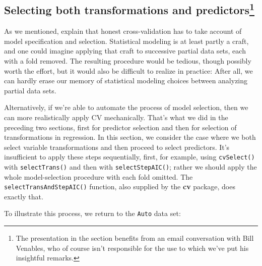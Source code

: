 \documentclass[
]{jss}
\begin{document}
\hypertarget{selecting-both-transformations-and-predictorsvenables}{%
\subsection[Selecting both transformations and
predictors]{\texorpdfstring{Selecting both transformations and
predictors\footnote{The presentation in the section benefits from an
  email conversation with Bill Venables, who of course isn't responsible
  for the use to which we've put his insightful remarks.}}{Selecting both transformations and predictors}}\label{selecting-both-transformations-and-predictorsvenables}}

As we mentioned, \citet[Sec. 7.10.2: ``The Wrong and Right Way to Do
Cross-validation'']{HastieTibshiraniFriedman:2009} explain that honest
cross-validation has to take account of model specification and
selection. Statistical modeling is at least partly a craft, and one
could imagine applying that craft to successive partial data sets, each
with a fold removed. The resulting procedure would be tedious, though
possibly worth the effort, but it would also be difficult to realize in
practice: After all, we can hardly erase our memory of statistical
modeling choices between analyzing partial data sets.

Alternatively, if we're able to automate the process of model selection,
then we can more realistically apply CV mechanically. That's what we did
in the preceding two sections, first for predictor selection and then
for selection of transformations in regression. In this section, we
consider the case where we both select variable transformations and then
proceed to select predictors. It's insufficient to apply these steps
sequentially, first, for example, using \texttt{cvSelect()} with
\texttt{selectTrans()} and then with \texttt{selectStepAIC()}; rather we
should apply the whole model-selection procedure with each fold omitted.
The \texttt{selectTransAndStepAIC()} function, also supplied by the
\textbf{cv} package, does exactly that.

To illustrate this process, we return to the \texttt{Auto} data set:
\end{document}
